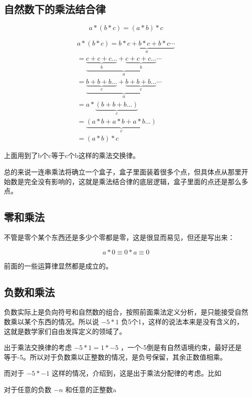 \documentclass[12pt,oneside]{book}
\begin{document}
\subsection{自然数下的乘法结合律}
\begin{equation}
a * (b * c) = (a * b) * c
\end{equation}

\begin{align*}
a * (b * c) = \underbrace{b*c + b*c + b*c \cdots}_a\\
=\underbrace{\underbrace{c + c +c ...}_b +  \underbrace{c + c +c ...}_b \cdots}_a\\
=\underbrace{\underbrace{b + b +b ...}_c +  \underbrace{b + b +b ...}_c \cdots}_a\\
=a *\underbrace{(b + b +b ...)}_c\\
=\underbrace{(a *b + a *b +a *b ...)}_c\\
=(a*b)*c
\end{align*}

上面用到了b个c等于c个b这样的乘法交换律。

总的来说一连串乘法将确立一个盒子，盒子里面装着很多个点，但具体点从那里开始数是完全没有影响的，这就是乘法结合律的底层逻辑，盒子里面的点还是那么多点。

\subsection{零和乘法}
不管是零个某个东西还是多少个零都是零，这是很显而易见，但还是写出来：

\begin{equation}
a * 0 \equiv 0 * a \equiv 0
\end{equation}

前面的一些运算律显然都是成立的。


\subsection{负数和乘法}
负数实际上是负向符号和自然数的组合，按照前面乘法定义分析，是只能接受自然数乘以某个东西的情况。所以说 $-5*1$ 负5个1，这样的说法本来是没有含义的，这就是数学家们自由发挥定义的领域了。

出于乘法交换律的考虑 $-5*1=1*-5$ ，一个-5倒是有自然语境约束，最好还是等于-5。所以对于负数乘以正整数的情况，是负号保留，其余正数值相乘。

而对于 $-5*-1$ 这样的情况，\cite{什么是数学}介绍到，这是出于乘法分配律的考虑。比如

对于任意的负数 $-n$ 和任意的正整数a
\end{document}
